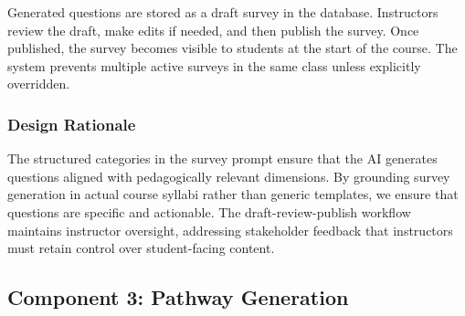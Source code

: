 \documentclass{stylefiles/capstone}
\begin{document}




Generated questions are stored as a draft survey in the database. Instructors review the draft, make edits if needed, and then publish the survey. Once published, the survey becomes visible to students at the start of the course. The system prevents multiple active surveys in the same class unless explicitly overridden.

\subsubsection{Design Rationale}

The structured categories in the survey prompt ensure that the AI generates questions aligned with pedagogically relevant dimensions. By grounding survey generation in actual course syllabi rather than generic templates, we ensure that questions are specific and actionable. The draft-review-publish workflow maintains instructor oversight, addressing stakeholder feedback that instructors must retain control over student-facing content.

\subsection{Component 3: Pathway Generation}
\end{document}
